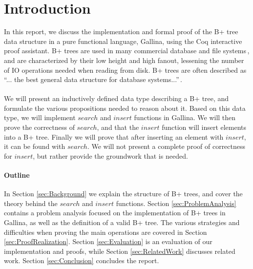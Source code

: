\section{Introduction}
\label{sec:Introduction}
In this report, we discuss the implementation and formal proof of the B+ tree data structure in a pure functional language, Gallina, using the Coq interactive proof assistant. B+ trees are used in many commercial database and file systems\,\cite[p. 359]{ramakrishnan2003database}, and are characterized by their low height and high fanout, lessening the number of IO operations needed when reading from disk. B+ trees are often described as ``... the best general data structure for database systems...''\,\cite[p. 84]{shasha2002database}.
\paragraph{}
We will present an inductively defined data type describing a B+ tree, and formulate the various propositions needed to reason about it. Based on this data type, we will implement $search$ and $insert$ functions in Gallina. We will then prove the correctness of $search$, and that the $insert$ function will insert elements into a B+ tree. Finally we will prove that after inserting an element with $insert$, it can be found with $search$. We will not present a complete proof of correctness for $insert$, but rather provide the groundwork that is needed.
\paragraph{Outline}
In Section \ref{sec:Background} we explain the structure of B+ trees, and cover the theory behind the $search$ and $insert$ functions. Section \ref{sec:ProblemAnalysis} contains a problem analysis focused on the implementation of B+ trees in Gallina, as well as the definition of a valid B+ tree. The various strategies and difficulties when proving the main operations are covered in Section \ref{sec:ProofRealization}. Section \ref{sec:Evaluation} is an evaluation of our implementation and proofs, while Section \ref{sec:RelatedWork} discusses related work. Section \ref{sec:Conclusion} concludes the report.

